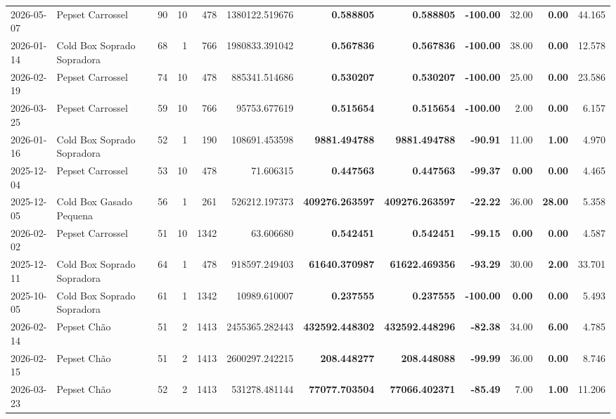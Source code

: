 {\begin{center}
{\begin{tabular}{@{}llrrrrrrrrrr@{}}
2026-05-07 & Pepset Carrossel & 90 & 10 & 478 & 1380122.519676 & \textbf{0.588805} & \textbf{0.588805} & \textbf{-100.00} & 32.00 & \textbf{0.00} & 44.165 \\
2026-01-14 & Cold Box Soprado Sopradora & 68 & 1 & 766 & 1980833.391042 & \textbf{0.567836} & \textbf{0.567836} & \textbf{-100.00} & 38.00 & \textbf{0.00} & 12.578 \\
2026-02-19 & Pepset Carrossel & 74 & 10 & 478 & 885341.514686 & \textbf{0.530207} & \textbf{0.530207} & \textbf{-100.00} & 25.00 & \textbf{0.00} & 23.586 \\
2026-03-25 & Pepset Carrossel & 59 & 10 & 766 & 95753.677619 & \textbf{0.515654} & \textbf{0.515654} & \textbf{-100.00} & 2.00 & \textbf{0.00} & 6.157 \\
2026-01-16 & Cold Box Soprado Sopradora & 52 & 1 & 190 & 108691.453598 & \textbf{9881.494788} & \textbf{9881.494788} & \textbf{-90.91} & 11.00 & \textbf{1.00} & 4.970 \\
2025-12-04 & Pepset Carrossel & 53 & 10 & 478 & 71.606315 & \textbf{0.447563} & \textbf{0.447563} & \textbf{-99.37} & \textbf{0.00} & \textbf{0.00} & 4.465 \\
2025-12-05 & Cold Box Gasado Pequena & 56 & 1 & 261 & 526212.197373 & \textbf{409276.263597} & \textbf{409276.263597} & \textbf{-22.22} & 36.00 & \textbf{28.00} & 5.358 \\
2026-02-02 & Pepset Carrossel & 51 & 10 & 1342 & 63.606680 & \textbf{0.542451} & \textbf{0.542451} & \textbf{-99.15} & \textbf{0.00} & \textbf{0.00} & 4.587 \\
2025-12-11 & Cold Box Soprado Sopradora & 64 & 1 & 478 & 918597.249403 & \textbf{61640.370987} & \textbf{61622.469356} & \textbf{-93.29} & 30.00 & \textbf{2.00} & 33.701 \\
2025-10-05 & Cold Box Soprado Sopradora & 61 & 1 & 1342 & 10989.610007 & \textbf{0.237555} & \textbf{0.237555} & \textbf{-100.00} & \textbf{0.00} & \textbf{0.00} & 5.493 \\
2026-02-14 & Pepset Chão & 51 & 2 & 1413 & 2455365.282443 & \textbf{432592.448302} & \textbf{432592.448296} & \textbf{-82.38} & 34.00 & \textbf{6.00} & 4.785 \\
2026-02-15 & Pepset Chão & 51 & 2 & 1413 & 2600297.242215 & \textbf{208.448277} & \textbf{208.448088} & \textbf{-99.99} & 36.00 & \textbf{0.00} & 8.746 \\
2026-03-23 & Pepset Chão & 52 & 2 & 1413 & 531278.481144 & \textbf{77077.703504} & \textbf{77066.402371} & \textbf{-85.49} & 7.00 & \textbf{1.00} & 11.206 \\

\end{tabular}}
\end{center}}
